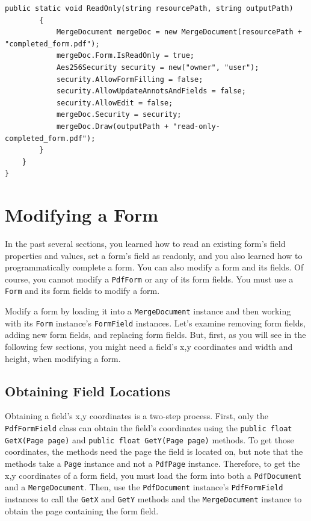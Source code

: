 \documentclass[american]{tufte-book}
\numberwithin{equation}{section}
\numberwithin{figure}{section}
\begin{document}
{{\begin{lstlisting}[caption={Setting a form as readonly.},label={lis:readonly-form},basicstyle={\footnotesize\ttfamily},breaklines=true]
        public static void ReadOnly(string resourcePath, string outputPath)
        {
            MergeDocument mergeDoc = new MergeDocument(resourcePath + "completed_form.pdf");
            mergeDoc.Form.IsReadOnly = true;
            Aes256Security security = new("owner", "user");
            security.AllowFormFilling = false;
            security.AllowUpdateAnnotsAndFields = false;
            security.AllowEdit = false;
            mergeDoc.Security = security;
            mergeDoc.Draw(outputPath + "read-only-completed_form.pdf");
        }
    }
}

\end{lstlisting}
\leavevmode\egroup

\section{Modifying a Form}

In the past several sections, you learned how to read an existing
form's field properties and values, set a form's field as readonly, and you also learned how to programmatically
complete a form. You can also modify a form and its fields. Of course,
you cannot modify a \texttt{PdfForm} or any of its form fields. You
must use a \texttt{Form} and its form fields to modify a form. 

Modify a form by loading it into a \texttt{MergeDocument} instance
and then working with its \texttt{Form} instance's \texttt{FormField}
instances. Let's examine removing form fields, adding new form fields,
and replacing form fields. But, first, as you will see in the following
few sections, you might need a field's x,y coordinates and width and
height, when modifying a form.

\subsection{Obtaining Field Locations}

Obtaining a field's x,y coordinates is a two-step process. First,
only the \texttt{PdfFormField} class can obtain the field's coordinates
using the \texttt{public float GetX(Page page)} and \texttt{public
float GetY(Page page)} methods. To get those coordinates, the methods
need the page the field is located on, but note that the methods take
a \texttt{Page} instance and not a \texttt{PdfPage} instance. Therefore,
to get the x,y coordinates of a form field, you must load the form
into both a \texttt{PdfDocument} and a \texttt{MergeDocument}. Then,
use the \texttt{PdfDocument} instance's \texttt{PdfFormField} instances
to call the \texttt{GetX} and \texttt{GetY} methods and the \texttt{MergeDocument}
instance to obtain the page containing the form field. 

}}
\end{document}

